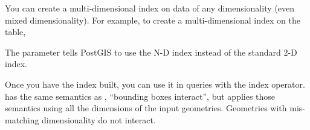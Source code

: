 \documentclass[a4paper,11pt,english]{sphinxmanual}
\begin{document}
You can create a multi-dimensional index on data of any dimensionality (even mixed dimensionality). For example, to create a multi-dimensional index on the  table,

\begin{sphinxVerbatim}[commandchars=\\\{\}]
    
   
\end{sphinxVerbatim}

The  parameter tells PostGIS to use the N-D index instead of the standard 2-D index.

Once you have the index built, you can use it in queries with the \sphinxcode{\sphinxupquote{\&\&\&}} index operator. \sphinxcode{\sphinxupquote{\&\&\&}} has the same semantics as \sphinxcode{\sphinxupquote{\&\&}}, “bounding boxes interact”, but applies those semantics using all the dimensions of the input geometries. Geometries with mis-matching dimensionality do not interact.

\begin{sphinxVerbatim}[commandchars=\\\{\}]
  

  

  
\end{sphinxVerbatim}
\end{document}
